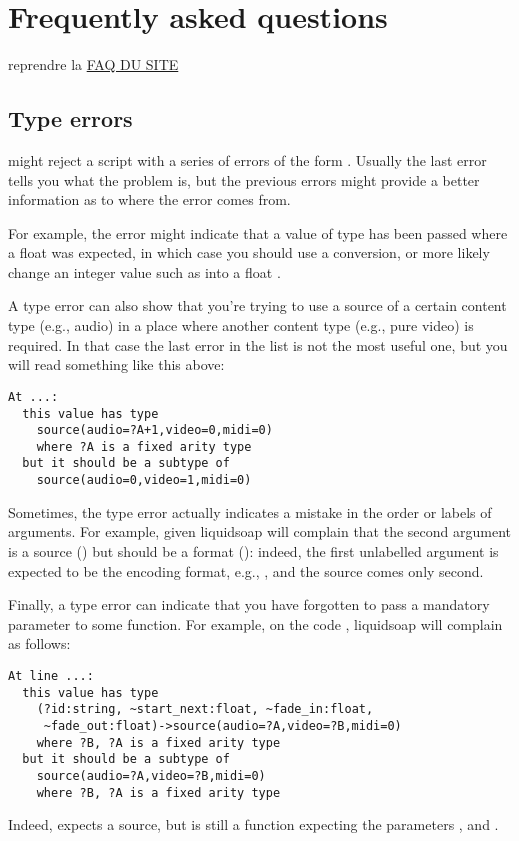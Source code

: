 \chapter{Frequently asked questions}
reprendre la \href{https://www.liquidsoap.info/doc-dev/faq.html}{FAQ DU SITE}

\section{Type errors}
\Liquidsoap might reject a script with a series of errors of the form . Usually the last error
tells you what the problem is, but the previous errors might provide a better
information as to where the error comes from.

For example, the error might indicate that a value of type  has been
passed where a float was expected, in which case you should use a conversion, or
more likely change an integer value such as  into a float
.

A type error can also show that you're trying to use a source of a certain
content type (e.g., audio) in a place where another content type (e.g., pure
video) is required. In that case the last error in the list is not the most
useful one, but you will read something like this above:
\begin{verbatim}
At ...:
  this value has type
    source(audio=?A+1,video=0,midi=0)
    where ?A is a fixed arity type
  but it should be a subtype of
    source(audio=0,video=1,midi=0)
\end{verbatim}

Sometimes, the type error actually indicates a mistake in the order or labels of
arguments. For example, given 
liquidsoap will complain that the second argument is a source
() but should be a format (): indeed, the
first unlabelled argument is expected to be the encoding format, e.g.,
, and the source comes only second.

Finally, a type error can indicate that you have forgotten to pass a mandatory
parameter to some function. For example, on the code
, liquidsoap will complain as follows:
\begin{verbatim}
At line ...:
  this value has type
    (?id:string, ~start_next:float, ~fade_in:float,
     ~fade_out:float)->source(audio=?A,video=?B,midi=0)
    where ?B, ?A is a fixed arity type
  but it should be a subtype of
    source(audio=?A,video=?B,midi=0)
    where ?B, ?A is a fixed arity type
\end{verbatim}
Indeed,  expects a source, but  is
still a function expecting the parameters ,
 and .


